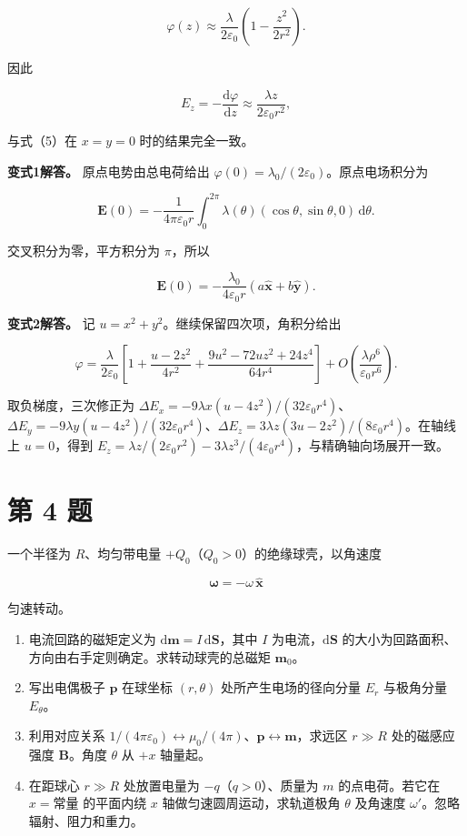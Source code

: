 \documentclass[12pt,a4paper,UTF8]{ctexart}
\newcommand{\tightlist}{\setlength{\itemsep}{0pt}\setlength{\parskip}{0pt}}
\begin{document}
\[\varphi(z)\approx\frac{\lambda}{2\varepsilon_0}
\left(1-\frac{z^2}{2r^2}\right).\]

因此

\[E_z=-\frac{\mathrm d\varphi}{\mathrm dz}
\approx\frac{\lambda z}{2\varepsilon_0r^2},\]

与式（5）在 \(x=y=0\) 时的结果完全一致。

\textbf{变式1解答。} 原点电势由总电荷给出
\(\varphi(0)=\lambda_0/(2\varepsilon_0)\)。原点电场积分为

\[\boldsymbol E(0)=-\frac1{4\pi\varepsilon_0r}\int_0^{2\pi}\lambda(\theta)(\cos\theta,\sin\theta,0)\,\mathrm d\theta.\]

交叉积分为零，平方积分为 \(\pi\)，所以

\[\boldsymbol E(0)=-\frac{\lambda_0}{4\varepsilon_0r}(a\hat{\boldsymbol x}+b\hat{\boldsymbol y}).\]

\textbf{变式2解答。} 记 \(u=x^2+y^2\)。继续保留四次项，角积分给出

\[\varphi=\frac{\lambda}{2\varepsilon_0}\left[1+\frac{u-2z^2}{4r^2}+\frac{9u^2-72uz^2+24z^4}{64r^4}\right]+O\!\left(\frac{\lambda\rho^6}{\varepsilon_0r^6}\right).\]

取负梯度，三次修正为
\(\Delta E_x=-9\lambda x(u-4z^2)/(32\varepsilon_0r^4)\)、\(\Delta E_y=-9\lambda y(u-4z^2)/(32\varepsilon_0r^4)\)、\(\Delta E_z=3\lambda z(3u-2z^2)/(8\varepsilon_0r^4)\)。在轴线上
\(u=0\)，得到
\(E_z=\lambda z/(2\varepsilon_0r^2)-3\lambda z^3/(4\varepsilon_0r^4)\)，与精确轴向场展开一致。

\newpage

\section{第 4 题}\label{ux7b2c-4-ux9898}

一个半径为 \(R\)、均匀带电量 \(+Q_0\)（\(Q_0>0\)）的绝缘球壳，以角速度

\[\boldsymbol\omega=-\omega\,\hat{\boldsymbol x}\]

匀速转动。

\begin{enumerate}
\def\labelenumi{\arabic{enumi}.}
\tightlist
\item
  电流回路的磁矩定义为
  \(\mathrm d\boldsymbol m=I\,\mathrm d\boldsymbol S\)，其中 \(I\)
  为电流，\(\mathrm d\boldsymbol S\)
  的大小为回路面积、方向由右手定则确定。求转动球壳的总磁矩
  \(\boldsymbol m_0\)。
\item
  写出电偶极子 \(\boldsymbol p\) 在球坐标 \((r,\theta)\)
  处所产生电场的径向分量 \(E_r\) 与极角分量 \(E_\theta\)。
\item
  利用对应关系
  \(1/(4\pi\varepsilon_0)\leftrightarrow\mu_0/(4\pi)\)、\(\boldsymbol p\leftrightarrow\boldsymbol m\)，求远区
  \(r\gg R\) 处的磁感应强度 \(\boldsymbol B\)。角度 \(\theta\) 从 \(+x\)
  轴量起。
\item
  在距球心 \(r\gg R\) 处放置电量为 \(-q\)（\(q>0\)）、质量为 \(m\)
  的点电荷。若它在 \(x=\text{常量}\) 的平面内绕 \(x\)
  轴做匀速圆周运动，求轨道极角 \(\theta\) 及角速度
  \(\omega'\)。忽略辐射、阻力和重力。
\end{enumerate}
\end{document}
